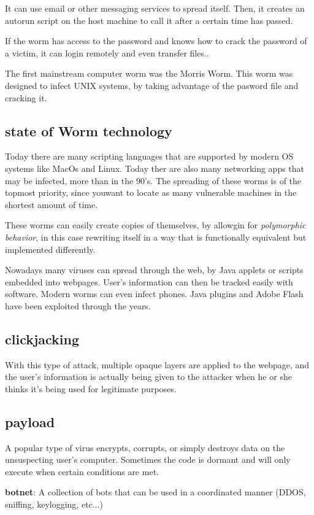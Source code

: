 \documentclass{article}
\begin{document}
 It can use email or other messaging services to spread itself. Then, it creates an autorun script on the host machine
 to call it after a certain time has passed.

 If the worm has access to the password and knows how to crack the password of a victim, it can login remotely and even 
 transfer files..

 The first mainstream computer worm was the Morris Worm. This worm was designed to infect UNIX systems, by taking advantage
 of the pasword file and cracking it.
 \subsection{state of Worm technology}
 Today there are many scripting languages that are supported by modern OS systems like MacOs and Linux. Today ther are also
 many networking apps that may be infected, more than in the 90's. The spreading of these worms is of the topmost 
 priority, since youwant to locate as many vulnerable machines in the shortest amount of time.

 These worms can easily create copies of themselves, by allowgin for \textit{polymorphic behavior}, in this case 
 rewriting itself in a way that is functionally equivalent but implemented differently.
 
 Nowadays many viruses can spread through the web, by Java applets or scripts embedded into webpages. User's information
 can then be tracked easily with software. Modern worms can even infect phones. Java plugins and Adobe Flash have been
 exploited through the years.
 \subsection{clickjacking}
 With this type of attack, multiple opaque layers are applied to the webpage, and the user's information is actually 
 being given to the attacker when he or she thinks it's being used for legitimate purposes.
\subsection{payload} 
A popular type of virus encrypts, corrupts, or simply destroys data on the unsuspecting user's computer. Sometimes the 
code is dormant and will only execute when certain conditions are met.

\textbf{botnet}: A collection of bots that can be used in a coordinated manner (DDOS, sniffing, keylogging, etc...)
\end{document}
